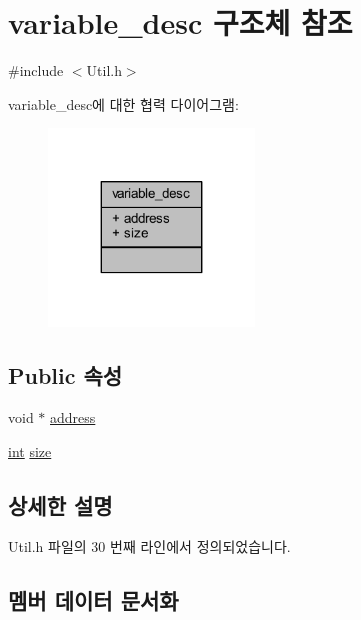 \hypertarget{structvariable__desc}{}\section{variable\+\_\+desc 구조체 참조}
\label{structvariable__desc}


{\ttfamily \#include $<$Util.\+h$>$}



variable\+\_\+desc에 대한 협력 다이어그램\+:\nopagebreak
\begin{figure}[H]
\begin{center}
\leavevmode
\includegraphics[width=155pt]{structvariable__desc__coll__graph}
\end{center}
\end{figure}
\subsection*{Public 속성}
\begin{DoxyCompactItemize}
\item 
void $\ast$ \mbox{\hyperlink{structvariable__desc_a8c9e09fce894d5f90f88b51a39a8d951}{address}}
\item 
\mbox{\hyperlink{_util_8cpp_a0ef32aa8672df19503a49fab2d0c8071}{int}} \mbox{\hyperlink{structvariable__desc_a4ba82f17bb7b2231d8884eebde322bca}{size}}
\end{DoxyCompactItemize}


\subsection{상세한 설명}


Util.\+h 파일의 30 번째 라인에서 정의되었습니다.



\subsection{멤버 데이터 문서화}
\mbox{\label{structvariable__desc_a8c9e09fce894d5f90f88b51a39a8d951}} 
